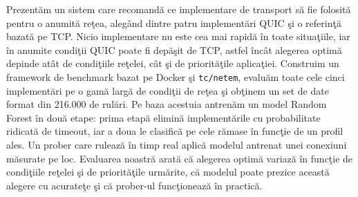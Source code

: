 Prezent\u{a}m un sistem care recomand\u{a} ce implementare de transport s\u{a} fie
folosit\u{a} pentru o anumit\u{a} re\c{t}ea, aleg\^{a}nd dintre patru
implement\u{a}ri QUIC \c{s}i o referin\c{t}\u{a} bazat\u{a} pe TCP. Nicio
implementare nu este cea mai rapid\u{a} \^{i}n toate situa\c{t}iile, iar
\^{i}n anumite condi\c{t}ii QUIC poate fi dep\u{a}\c{s}it de TCP, astfel
\^{i}nc\^{a}t alegerea optim\u{a} depinde at\^{a}t de condi\c{t}iile
re\c{t}elei, c\^{a}t \c{s}i de priorit\u{a}\c{t}ile aplica\c{t}iei. Construim un
framework de benchmark bazat pe Docker \c{s}i \texttt{tc/netem}, evalu\u{a}m
toate cele cinci implement\u{a}ri pe o gam\u{a} larg\u{a} de condi\c{t}ii de
re\c{t}ea \c{s}i ob\c{t}inem un set de date format din 216.000 de rul\u{a}ri. Pe
baza acestuia antren\u{a}m un model Random Forest \^{i}n dou\u{a} etape: prima
etap\u{a} elimin\u{a} implement\u{a}rile cu probabilitate ridicat\u{a} de
timeout, iar a doua le clasific\u{a} pe cele r\u{a}mase \^{i}n func\c{t}ie de un
profil ales. Un prober care ruleaz\u{a} \^{i}n timp real aplic\u{a} modelul
antrenat unei conexiuni m\u{a}surate pe loc. Evaluarea noastr\u{a} arat\u{a}
c\u{a} alegerea optim\u{a} variaz\u{a} \^{i}n func\c{t}ie de condi\c{t}iile
re\c{t}elei \c{s}i de priorit\u{a}\c{t}ile urm\u{a}rite, c\u{a} modelul poate
prezice aceast\u{a} alegere cu acurate\c{t}e \c{s}i c\u{a} prober-ul
func\c{t}ioneaz\u{a} \^{i}n practic\u{a}.
